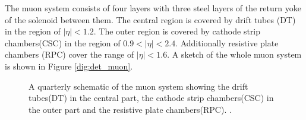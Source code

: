 The muon system \cite{Bayatian:922757} consists of four layers with three steel layers of the return yoke of the solenoid between them.
The central region is covered by drift tubes (DT) in the region of $|\eta|< 1.2$. The outer region is covered by cathode strip chambers(CSC) in the region of $0.9<|\eta|<2.4$.
Additionally resistive plate chambers (RPC) cover the range of $|\eta|<1.6$.
A sketch of the whole muon system is shown in Figure \ref{dig:det_muon}.

\begin{figure}[htbp!]
  \begin{center}

\caption{A quarterly schematic of the muon system showing the drift tubes(DT) in the central part, the cathode strip chambers(CSC) in the outer part and the resistive plate chambers(RPC). \cite{Bayatian:922757}.
  \label{fig:det_muon}}
  \end{center}
\end{figure}

